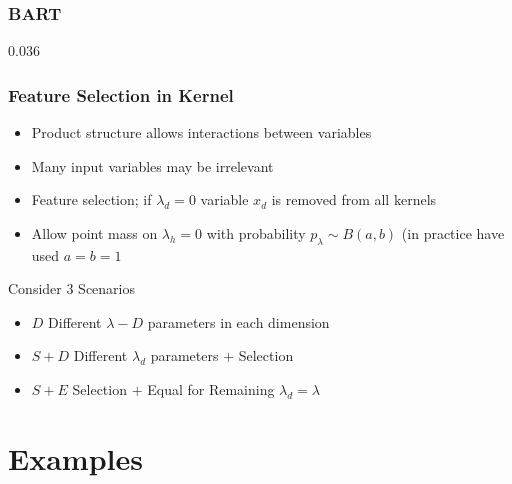 \documentclass[]{beamer}
\newcommand{\bs}[2]{\begin{frame} \frametitle{#1}
{#2}
\end{frame} }
\begin{document}
\begin{frame}[fragile] \frametitle{BART}
\begin{Schunk}
\end{Schunk}


\begin{Schunk}
\begin{Soutput}
[1] 0.036
\end{Soutput}
\end{Schunk}


\end{frame}


\bs{Feature Selection in Kernel} {
\begin{itemize}
\item Product structure allows interactions between variables  \pause
\item Many input variables may be irrelevant \pause
\item Feature selection; if $\lambda_d = 0$ variable $x_d$ is removed
  from all kernels \pause
\item Allow point mass on $\lambda_h = 0$ with probability $p_\lambda
  \sim B(a,b)$  (in practice have used $a = b = 1$ \pause
\end{itemize}

Consider 3 Scenarios

\begin{itemize}
\item $D$ Different $\lambda-D$ parameters in each dimension \pause
\item $S + D$ Different $\lambda_d$ parameters $+$ Selection \pause
\item $S + E$ Selection $+$ Equal for Remaining $\lambda_d = \lambda$
\end{itemize}

}

\section{Examples}
\end{document}
